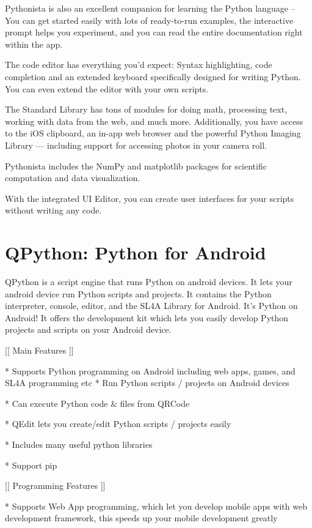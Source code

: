 Pythonista is also an excellent companion for learning the Python language – You can get started easily with lots of ready-to-run examples, the interactive prompt helps you experiment, and you can read the entire documentation right within the app.

The code editor has everything you'd expect: Syntax highlighting, code completion and an extended keyboard specifically designed for writing Python. You can even extend the editor with your own scripts.

The Standard Library has tons of modules for doing math, processing text, working with data from the web, and much more. Additionally, you have access to the iOS clipboard, an in-app web browser and the powerful Python Imaging Library — including support for accessing photos in your camera roll.

Pythonista includes the NumPy and matplotlib packages for scientific computation and data visualization. 

With the integrated UI Editor, you can create user interfaces for your scripts without writing any code.





\newpage
\section{QPython: Python for Android}

QPython is a script engine that runs Python on android devices. It lets your android device run Python scripts and projects. It contains the Python interpreter, console, editor, and the SL4A Library for Android. It’s Python on Android! It offers the development kit which lets you easily develop Python projects and scripts on your Android device.


[[ Main Features ]] 

* Supports Python programming on Android including web apps, games, and SL4A programming etc * Run Python scripts / projects on Android devices 

* Can execute Python code \& files from QRCode 

* QEdit lets you create/edit Python scripts / projects easily 

* Includes many useful python libraries 

* Support pip 

[[ Programming Features ]] 

* Supports Web App programming, which let you develop mobile apps with web development framework, this speeds up your mobile development greatly 

